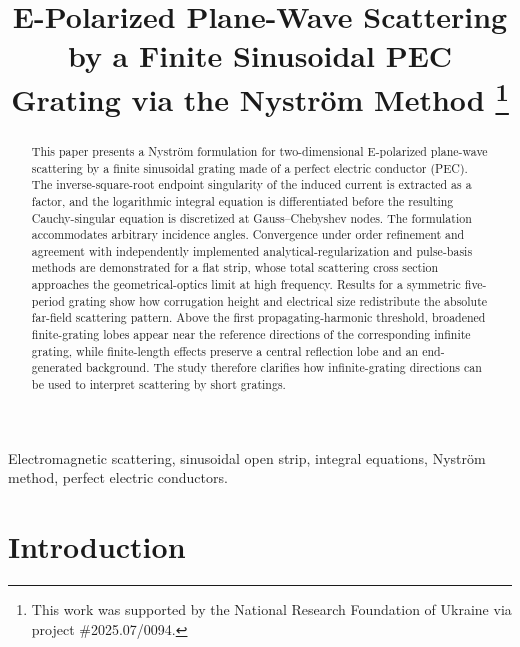 \documentclass[conference]{IEEEtran}
\begin{document}
\title{E-Polarized Plane-Wave Scattering by a Finite Sinusoidal PEC Grating via the Nystr\"om Method%
\thanks{This work was supported by the National Research Foundation of Ukraine via project \#2025.07/0094.}}

\author{
}

\maketitle

\begin{abstract}
This paper presents a Nystr\"om formulation for two-dimensional E-polarized
plane-wave scattering by a finite sinusoidal grating made of a perfect electric
conductor (PEC). The inverse-square-root endpoint singularity of the induced current
is extracted as a factor, and the logarithmic integral equation is
differentiated before the resulting Cauchy-singular equation is discretized at
Gauss--Chebyshev nodes. The formulation accommodates arbitrary incidence
angles. Convergence under order refinement and agreement with independently
implemented analytical-regularization and pulse-basis methods are demonstrated
for a flat strip, whose total scattering cross section approaches the
geometrical-optics limit at high frequency. Results for a symmetric five-period
grating show how corrugation height and electrical size redistribute the
absolute far-field scattering pattern. Above the first
propagating-harmonic threshold, broadened finite-grating lobes appear near the
reference directions of the corresponding infinite grating, while finite-length
effects preserve a central reflection lobe and an end-generated background. The
study therefore clarifies how infinite-grating directions can be used to
interpret scattering by short gratings.
\end{abstract}

\begin{IEEEkeywords}
Electromagnetic scattering, sinusoidal open strip, integral equations, Nystr\"om
method, perfect electric conductors.
\end{IEEEkeywords}

\section{Introduction}
\end{document}
